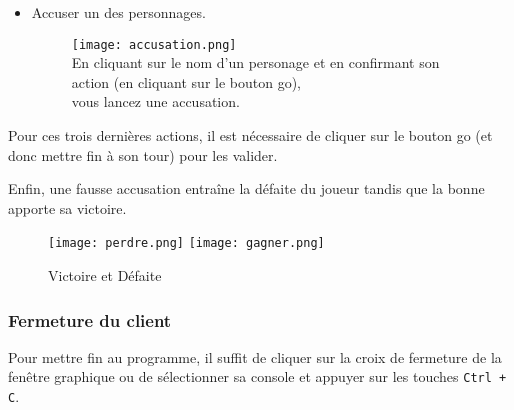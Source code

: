 \begin{itemize}
  \item Accuser un des personnages.
  \begin{figure}[H]
       \begin{center}
           \texttt{[image: accusation.png]}
           \\
           \tiny En cliquant sur le nom d'un personage et en confirmant son action (en cliquant sur le bouton go), \\vous lancez une accusation.
       \end{center}
       \label{fig:accusation}
   \end{figure}

\end{itemize}

Pour ces trois dernières actions, il est nécessaire de cliquer sur le bouton go (et donc mettre fin à son tour) pour les valider.

Enfin, une fausse accusation entraîne la défaite du joueur tandis que la bonne apporte sa victoire.

\begin{figure}[H]
   \begin{center}
       \texttt{[image: perdre.png]}
       \texttt{[image: gagner.png]}
   \end{center}
    \caption{Victoire et Défaite}
   \label{fig:defaitevictoire}
\end{figure}

\subsubsection{Fermeture du client}

Pour mettre fin au programme, il suffit de cliquer sur la croix de fermeture de la fenêtre graphique ou de sélectionner sa console et appuyer sur les touches \verb|Ctrl + C|.